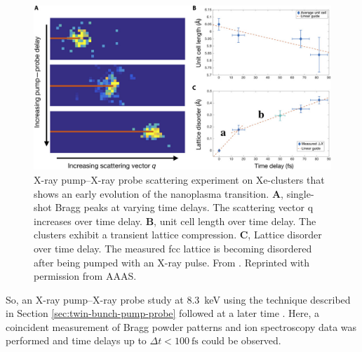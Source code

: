 \begin{figure}
	\centering
		\includegraphics[width=1.00\textwidth]{images/ken-science.jpg}
	\caption[Experiment that shows early evolution of the nanoplasma transition.]{X-ray pump--X-ray probe scattering experiment on Xe-clusters that shows an early evolution of the nanoplasma transition. \textbf{A}, single-shot Bragg peaks at varying time delays. The scattering vector q increases over time delay. \textbf{B}, unit cell length over time delay. The clusters exhibit a transient lattice compression. \textbf{C}, Lattice disorder over time delay. The measured fcc lattice is becoming disordered after being pumped with an X-ray pulse. From \citep{Ferguson-2016-SciAdv}. Reprinted with permission from AAAS.}
	\label{fig:ken-science}
\end{figure}
So, an X-ray pump--X-ray probe study at \SI{8.3}{\kilo\electronvolt} using the technique described in Section \ref{sec:twin-bunch-pump-probe} followed at a later time \citep{Ferguson-2016-SciAdv}. Here, a coincident measurement of Bragg powder patterns and ion spectroscopy data was performed and time delays up to $\Delta t<\SI{100}{\femto\second}$ could be observed.
